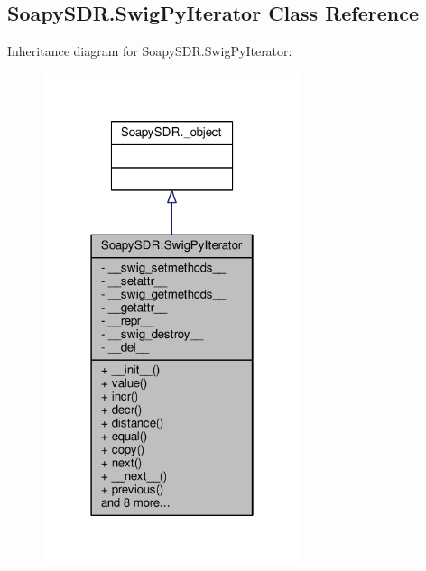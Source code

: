 \subsection{Soapy\+S\+D\+R.\+Swig\+Py\+Iterator Class Reference}
\label{classSoapySDR_1_1SwigPyIterator}


Inheritance diagram for Soapy\+S\+D\+R.\+Swig\+Py\+Iterator\+:
\nopagebreak
\begin{figure}[H]
\begin{center}
\leavevmode
\includegraphics[width=214pt]{d6/d8d/classSoapySDR_1_1SwigPyIterator__inherit__graph}
\end{center}
\end{figure}


